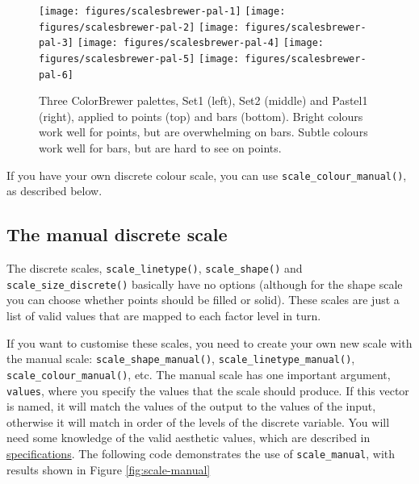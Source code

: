 \begin{figure}

{\centering \texttt{[image: figures/scalesbrewer-pal-1]} \texttt{[image: figures/scalesbrewer-pal-2]} \texttt{[image: figures/scalesbrewer-pal-3]} \texttt{[image: figures/scalesbrewer-pal-4]} \texttt{[image: figures/scalesbrewer-pal-5]} \texttt{[image: figures/scalesbrewer-pal-6]} 

}

\caption{Three ColorBrewer palettes, Set1 (left), Set2 (middle) and Pastel1 (right), applied to points (top) and bars (bottom). Bright colours work well for points, but are overwhelming on bars. Subtle colours work well for bars, but are hard to see on points.\label{fig:brewer-pal}}
\end{figure}

If you have your own discrete colour scale, you can use
\texttt{scale\_colour\_manual()}, as described below.

\subsection{The manual discrete scale}\label{sub:scale-manual}

The discrete scales, \texttt{scale\_linetype()}, \texttt{scale\_shape()}
and \texttt{scale\_size\_discrete()} basically have no options (although
for the shape scale you can choose whether points should be filled or
solid). These scales are just a list of valid values that are mapped to
each factor level in turn.  

If you want to customise these scales, you need to create your own new
scale with the manual scale: \texttt{scale\_shape\_manual()},
\texttt{scale\_linetype\_manual()}, \texttt{scale\_colour\_manual()},
etc. The manual scale has one important argument, \texttt{values}, where
you specify the values that the scale should produce. If this vector is
named, it will match the values of the output to the values of the
input, otherwise it will match in order of the levels of the discrete
variable. You will need some knowledge of the valid aesthetic values,
which are described in \hyperref[cha:specifications]{specifications}.
The following code demonstrates the use of \texttt{scale\_manual}, with
results shown in Figure \ref{fig:scale-manual}
 

